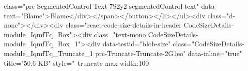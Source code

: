 class="prc-SegmentedControl-Text-7S2y2 segmentedControl-text" data-text="Blame">Blame</div></span></button></li></ul><div class="d-none"></div><div class="react-code-size-details-in-header CodeSizeDetails-module_IqmfTq_Box"><div class="text-mono CodeSizeDetails-module_IqmfTq_Box_1"><div data-testid="blob-size" class="CodeSizeDetails-module_IqmfTq_Truncate_1 prc-Truncate-Truncate-2G1eo" data-inline="true" title="50.6 KB" style="--truncate-max-width:100%